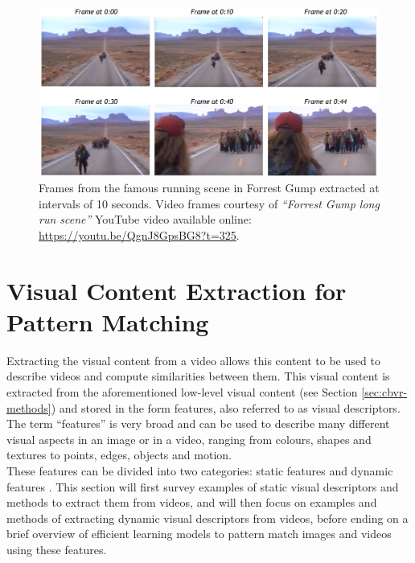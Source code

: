 \begin{figure}[h]
\centerline{\includegraphics[width=\textwidth]{figures/litsurvey/forrest_gump_shot.jpg}}
\caption{\label{fig:forrest_gump_frames}Frames from the famous running scene in Forrest Gump extracted at intervals of 10 seconds. Video frames courtesy of \textit{``Forrest Gump long run scene''} YouTube video available online: \url{https://youtu.be/QgnJ8GpsBG8?t=325}.}
\end{figure}

\section{Visual Content Extraction for Pattern Matching}
\label{sec:visual-content-extraction}

Extracting the visual content from a video allows this content to be used to describe videos and compute similarities between them. This visual content is extracted from the aforementioned low-level visual content (see Section \ref{sec:cbvr-methods}) \cite{petkovic2000} and stored in the form features, also referred to as visual descriptors. The term ``features'' is very broad and can be used to describe many different visual aspects in an image or in a video, ranging from colours, shapes and textures to points, edges, objects and motion.\\

These features can be divided into two categories: static features and dynamic features \cite{petkovic2000}. This section will first survey examples of static visual descriptors and methods to extract them from videos, and will then focus on examples and methods of extracting dynamic visual descriptors from videos, before ending on a brief overview of efficient learning models to pattern match images and videos using these features.

